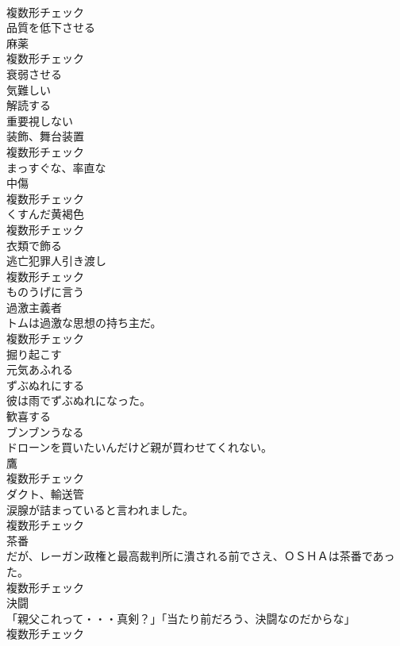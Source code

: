 \documentclass[8pt]{extreport}
\begin{document}
\begin{CJK}{UTF8}{min}
\\	複数形チェック
\\	[動詞]	品質を低下させる	
\\	[名詞]	麻薬	
\\	複数形チェック
\\	[動詞]	衰弱させる	
\\	[形容詞]	気難しい	
\\	[動詞]	解読する	
\\	[動詞]	重要視しない	
\\	[名詞]	装飾、舞台装置	
\\	複数形チェック
\\	[形容詞]	まっすぐな、率直な	
\\	[名詞]	中傷	
\\	複数形チェック
\\	[名詞]	くすんだ⻩褐色	
\\	複数形チェック
\\	[動詞]	衣類で飾る	
\\	[名詞]	逃亡犯罪人引き渡し	
\\	複数形チェック
\\	[動詞]	ものうげに言う	
\\	[名詞]	過激主義者	
\\	トムは過激な思想の持ち主だ。	
\\	複数形チェック
\\	[動詞]	掘り起こす	
\\	[形容詞]	元気あふれる	
\\	[動詞]	ずぶぬれにする	
\\	彼は雨でずぶぬれになった。	
\\	[動詞]	歓喜する	
\\	[動詞]	ブンブンうなる	
\\	ドローンを買いたいんだけど親が買わせてくれない。	
\\	[名詞]	鷹	
\\	複数形チェック
\\	[名詞]	ダクト、輸送管	
\\	涙腺が詰まっていると言われました。	
\\	複数形チェック
\\	[名詞]	茶番	
\\	だが、レーガン政権と最高裁判所に潰される前でさえ、ＯＳＨＡは茶番であった。	
\\	複数形チェック
\\	[名詞]	決闘	
\\	「親父これって・・・真剣？」「当たり前だろう、決闘なのだからな」	
\\	複数形チェック

\end{CJK}
\end{document}
